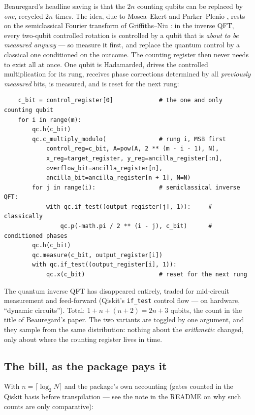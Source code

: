 \documentclass[11pt]{article}
\newcommand{\code}[1]{\texttt{#1}}
\theoremstyle{plain}
\theoremstyle{remark}
\begin{document}
Beauregard's headline saving \cite{beauregard} is that the $2n$ counting qubits can be replaced by
\emph{one}, recycled $2n$ times. The idea, due to Mosca--Ekert \cite{mosca-ekert} and
Parker--Plenio \cite{parker-plenio}, rests on the semiclassical Fourier transform of
Griffiths--Niu \cite{griffiths-niu}: in the inverse QFT, every two-qubit controlled rotation is
controlled by a qubit that is \emph{about to be measured anyway} --- so measure it first, and
replace the quantum control by a classical one conditioned on the outcome. The counting register
then never needs to exist all at once. One qubit is Hadamarded, drives the controlled
multiplication for its rung, receives phase corrections determined by all \emph{previously
measured} bits, is measured, and is reset for the next rung:

\begin{lstlisting}
    c_bit = control_register[0]             # the one and only counting qubit
    for i in range(m):
        qc.h(c_bit)
        qc.c_multiply_modulo(               # rung i, MSB first
            control_reg=c_bit, A=pow(A, 2 ** (m - i - 1), N),
            x_reg=target_register, y_reg=ancilla_register[:n],
            overflow_bit=ancilla_register[n],
            ancilla_bit=ancilla_register[n + 1], N=N)
        for j in range(i):                  # semiclassical inverse QFT:
            with qc.if_test((output_register[j], 1)):     # classically
                qc.p(-math.pi / 2 ** (i - j), c_bit)      # conditioned phases
        qc.h(c_bit)
        qc.measure(c_bit, output_register[i])
        with qc.if_test((output_register[i], 1)):
            qc.x(c_bit)                     # reset for the next rung
\end{lstlisting}

\noindent
The quantum inverse QFT has disappeared entirely, traded for mid-circuit measurement and
feed-forward (Qiskit's \code{if\_test} control flow --- on hardware, ``dynamic circuits''). Total:
$1+n+(n{+}2)=2n+3$ qubits, the count in the title of Beauregard's paper. The two variants are
toggled by one argument, and they sample from the same distribution: nothing about the
\emph{arithmetic} changed, only about where the counting register lives in time.

\subsection{The bill, as the package pays it}\label{sec:code-counts}

With $n=\lceil\log_2N\rceil$ and the package's own accounting \cite{repo} (gates counted in the
Qiskit basis before transpilation --- see the note in the README on why such counts are only
comparative):
\end{document}
